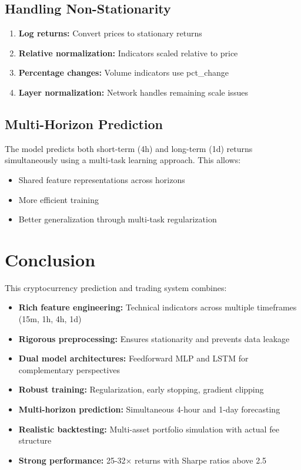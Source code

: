 \documentclass[12pt,a4paper]{article}
\begin{document}
\subsection{Handling Non-Stationarity}
\begin{enumerate}
    \item \textbf{Log returns:} Convert prices to stationary returns
    \item \textbf{Relative normalization:} Indicators scaled relative to price
    \item \textbf{Percentage changes:} Volume indicators use pct\_change
    \item \textbf{Layer normalization:} Network handles remaining scale issues
\end{enumerate}

\subsection{Multi-Horizon Prediction}
The model predicts both short-term (4h) and long-term (1d) returns simultaneously using a multi-task learning approach. This allows:
\begin{itemize}
    \item Shared feature representations across horizons
    \item More efficient training
    \item Better generalization through multi-task regularization
\end{itemize}

\section{Conclusion}

This cryptocurrency prediction and trading system combines:
\begin{itemize}
    \item \textbf{Rich feature engineering:} Technical indicators across multiple timeframes (15m, 1h, 4h, 1d)
    \item \textbf{Rigorous preprocessing:} Ensures stationarity and prevents data leakage
    \item \textbf{Dual model architectures:} Feedforward MLP and LSTM for complementary perspectives
    \item \textbf{Robust training:} Regularization, early stopping, gradient clipping
    \item \textbf{Multi-horizon prediction:} Simultaneous 4-hour and 1-day forecasting
    \item \textbf{Realistic backtesting:} Multi-asset portfolio simulation with actual fee structure
    \item \textbf{Strong performance:} 25-32× returns with Sharpe ratios above 2.5
\end{itemize}
\end{document}
